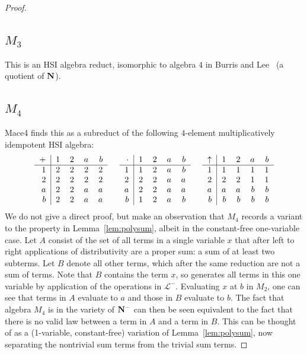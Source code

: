 \documentclass[eqnor,reqno]{amsart}
\theoremstyle{plain}
\theoremstyle{definition}
\begin{document}
\begin{proof}
\subsection{$M_3$} This is an HSI algebra reduct, isomorphic to algebra $4$ in Burris and Lee~\cite[Theorem~4.1]{burlee92} (a quotient of ${\bf N}$).

\subsection{$M_4$} Mace4 finds this as a subreduct of the following $4$-element multiplicatively idempotent HSI algebra:
\[
\begin{tabular}{r|rrrr}
$+$ & $1$ & $2$ & $a$ & $b$\\
\hline
    $1$ & $2$ & $2$ & $2$ & $2$ \\
    $2$ & $2$ & $2$ & $2$ & $2$ \\
    $a$ & $2$ & $2$ & $a$ & $a$ \\
    $b$ & $2$ & $2$ & $a$ & $a$
\end{tabular} \hspace{.5cm}
\begin{tabular}{r|rrrr}
$\cdot$ & $1$ & $2$ & $a$ & $b$\\
\hline
    $1$ & $1$ & $2$ & $a$ & $b$ \\
    $2$ & $2$ & $2$ & $a$ & $a$ \\
    $a$ & $2$ & $2$ & $a$ & $a$ \\
    $b$ & $1$ & $2$ & $a$ & $b$
\end{tabular} \hspace{.5cm}
\begin{tabular}{r|rrrr}
$\uparrow$ & $1$ & $2$ & $a$ & $b$\\
\hline
    $1$ & $1$ & $1$ & $1$ & $1$ \\
    $2$ & $2$ & $2$ & $1$ & $1$ \\
    $a$ & $a$ & $a$ & $b$ & $b$ \\
    $b$ & $b$ & $b$ & $b$ & $b$
\end{tabular}
\]
We do not give a direct proof, but make an observation that $M_4$ records a variant to the property in Lemma~\ref{lem:polysum}, albeit in the constant-free one-variable case.
Let $A$ consist of the set of all terms in a single variable $x$ that after left to right applications of distributivity are a proper sum: a sum of at least two subterms.  
Let $B$ denote all other terms, which after the same reduction are not a sum of terms.  
Note that $B$ contains the term $x$, so generates all terms in this one variable by application of the operations in $\mathscr{L}^-$. 
Evaluating $x$ at $b$ in $M_2$, one can see that terms in $A$ evaluate to $a$ and those in $B$ evaluate to $b$.
The fact that algebra $M_4$ is in the variety of ${\bf N}^-$ can then be seen equivalent to the fact that there is no valid law between a term in $A$ and a term in $B$. 
This can be thought of as a (1-variable, constant-free) variation of Lemma~\ref{lem:polysum}, now separating the nontrivial sum terms from the trivial sum terms.


\end{proof}
\end{document}
